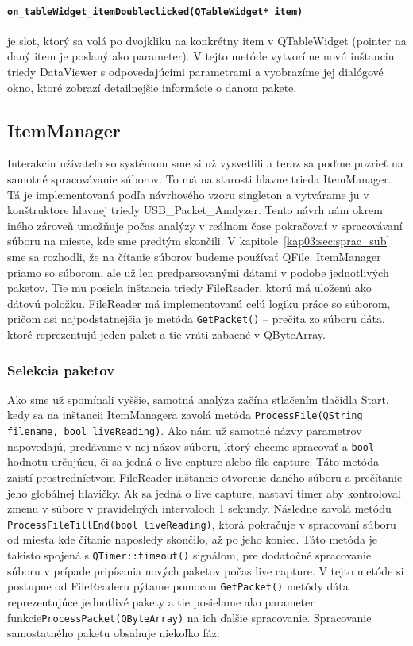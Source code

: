 \paragraph{\texttt{on\_tableWidget\_itemDoubleclicked(QTableWidget* item)}}
\label{kap04:sec:double_click}

je slot, ktorý \newline sa volá po dvojkliku na konkrétny item v QTableWidget (pointer na daný item je poslaný ako parameter). V tejto metóde vytvoríme novú inštanciu triedy DataViewer s odpovedajúcimi parametrami a vyobrazíme jej dialógové okno, ktoré zobrazí detailnejšie informácie o danom pakete.

\subsection{ItemManager}
\label{kap04:sec:item_manager}
Interakciu užívateľa so systémom sme si už vysvetlili a teraz sa poďme pozrieť na samotné spracovávanie súborov. To má na starosti hlavne trieda ItemManager. Tá je implementovaná podľa návrhového vzoru singleton a vytvárame ju v konštruktore hlavnej triedy USB\_Packet\_Analyzer. Tento návrh nám okrem iného zároveň umožňuje počas analýzy v reálnom čase pokračovať v spracovávaní súboru na mieste, kde sme predtým skončili. V kapitole~\ref{kap03:sec:sprac_sub} sme sa rozhodli, že na čítanie súborov budeme používať QFile. ItemManager priamo so súborom, ale už len predparsovanými dátami v podobe jednotlivých paketov. Tie mu posiela inštancia triedy FileReader, ktorú má uloženú ako dátovú položku. FileReader má implementovanú celú logiku práce so súborom, pričom asi najpodstatnejšia je metóda \texttt{GetPacket()} -- prečíta zo súboru dáta, ktoré reprezentujú jeden paket a tie vráti zabaené v QByteArray.

\subsubsection{Selekcia paketov}

Ako sme už spomínali vyššie, samotná analýza začína stlačením tlačidla Start, kedy sa na inštancii ItemManagera zavolá metóda \texttt{ProcessFile(QString file\-name, bool liveReading)}. Ako nám už samotné názvy parametrov napovedajú, predávame v nej názov súboru, ktorý chceme spracovať a \texttt{bool} hodnotu určujúcu, či sa jedná o live capture alebo file capture. Táto metóda zaistí prostredníctvom FileReader inštancie otvorenie daného súboru a prečítanie jeho globálnej hlavičky. Ak sa jedná o live capture, nastaví timer aby kontroloval zmenu v súbore v pravidelných intervaloch 1 sekundy. Následne zavolá metódu \texttt{ProcessFileTillEnd(bool liveReading)}, ktorá pokračuje v spracovaní súboru od miesta kde čítanie naposledy skončilo, až po jeho koniec. Táto metóda je takisto spojená s \texttt{QTimer::timeout()} signálom, pre dodatočné spracovanie súboru v prípade pripísania nových paketov počas live capture. V tejto metóde si postupne od FileReaderu pýtame pomocou \texttt{GetPacket()} metódy dáta reprezentujúce jednotlivé pakety a tie posielame ako parameter funkcie\newline \texttt{ProcessPacket(QByteArray)} na ich ďalšie spracovanie. Spracovanie samostatného paketu obsahuje niekoľko fáz:
